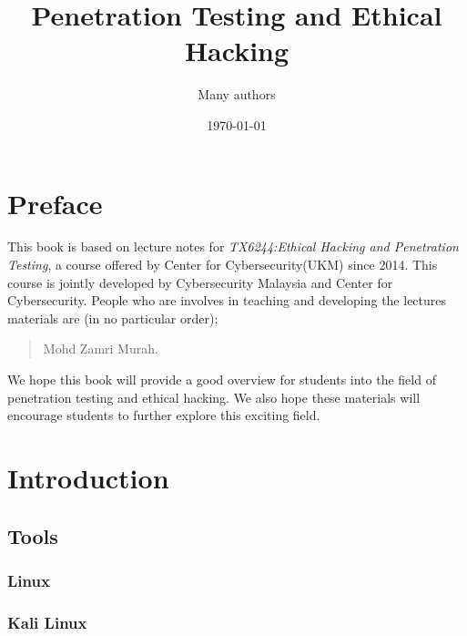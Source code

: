 \documentclass[11pt,a4paper]{book}
\title{Penetration Testing and Ethical Hacking}
\author{Many authors}
\date{\today}
\begin{document}

\frontmatter
\maketitle

\tableofcontents
\listoffigures
\listoftables

\mainmatter

\chapter{Preface}

This book is based on lecture notes for \textit{TX6244:Ethical Hacking and Penetration Testing}, a course offered by Center for Cybersecurity(UKM) since 2014. This course is jointly developed by Cybersecurity Malaysia and Center for Cybersecurity. People who are involves in teaching and developing the lectures materials are (in no particular order);

\begin{quote}
Mohd Zamri Murah,
\end{quote}


We hope this book will provide a good overview for students into the field of penetration testing and ethical hacking. We also hope these materials will encourage students to further explore this exciting field.

\chapter{Introduction}





\nocite{*}

\section{Tools}

\subsection{Linux}
\subsection{Kali Linux}
\end{document}
